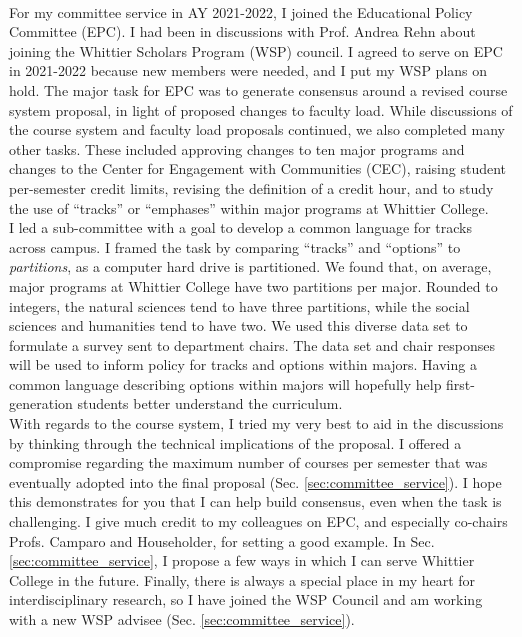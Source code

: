 \documentclass[../../main.tex]{subfiles}
\begin{document}
\\
\vspace{0.25cm}
For my committee service in AY 2021-2022, I joined the Educational Policy Committee (EPC).  I had been in discussions with Prof. Andrea Rehn about joining the Whittier Scholars Program (WSP) council.  I agreed to serve on EPC in 2021-2022 because new members were needed, and I put my WSP plans on hold.  The major task for EPC was to generate consensus around a revised course system proposal, in light of proposed changes to faculty load.  While discussions of the course system and faculty load proposals continued, we also completed many other tasks.  These included approving changes to ten major programs and changes to the Center for Engagement with Communities (CEC), raising student per-semester credit limits, revising the definition of a credit hour, and to study the use of ``tracks'' or ``emphases'' within major programs at Whittier College.
\\
\vspace{0.25cm}
I led a sub-committee with a goal to develop a common language for tracks across campus.  I framed the task by comparing ``tracks'' and ``options'' to \textit{partitions}, as a computer hard drive is partitioned.  We found that, on average, major programs at Whittier College have two partitions per major. Rounded to integers, the natural sciences tend to have three partitions, while the social sciences and humanities tend to have two.  We used this diverse data set to formulate a survey sent to department chairs.  The data set and chair responses will be used to inform policy for tracks and options within majors.  Having a common language describing options within majors will hopefully help first-generation students better understand the curriculum.
\\
\vspace{0.25cm}
With regards to the course system, I tried my very best to aid in the discussions by thinking through the technical implications of the proposal.  I offered a compromise regarding the maximum number of courses per semester that was eventually adopted into the final proposal (Sec. \ref{sec:committee_service}).  I hope this demonstrates for you that I can help build consensus, even when the task is challenging.  I give much credit to my colleagues on EPC, and especially co-chairs Profs. Camparo and Householder, for setting a good example.  In Sec. \ref{sec:committee_service}, I propose a few ways in which I can serve Whittier College in the future.  Finally, there is always a special place in my heart for interdisciplinary research, so I have joined the WSP Council and am working with a new WSP advisee (Sec. \ref{sec:committee_service}).
\end{document}
